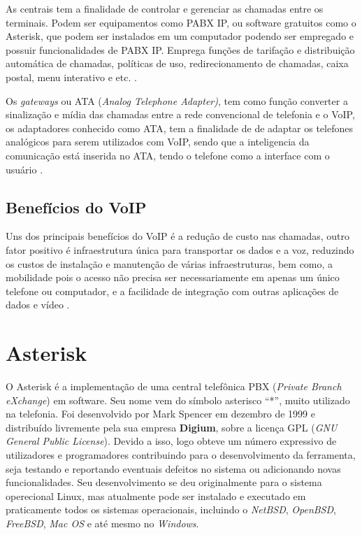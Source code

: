 As centrais tem a finalidade de controlar e gerenciar as chamadas entre os terminais. Podem ser equipamentos como PABX IP, ou software gratuitos como o Asterisk, que podem ser instalados em um computador podendo ser empregado e possuir funcionalidades de PABX IP. Emprega funções de tarifação e distribuição automática de chamadas, políticas de uso, redirecionamento de chamadas, caixa postal, menu interativo e etc. \cite{alexandrekeller2014}.

Os \textit{gateways} ou ATA (\textit{Analog Telephone Adapter)}, tem como função converter a sinalização e mídia das chamadas entre a rede convencional de telefonia e o VoIP, os adaptadores conhecido como ATA, tem a finalidade de de adaptar os telefones analógicos para serem utilizados com VoIP, sendo que a inteligencia da comunicação está inserida no ATA, tendo o telefone como a interface com o usuário \cite{eduardomaronasmonks2006}.


\subsection{Benefícios do VoIP}
Uns dos principais benefícios do VoIP é a redução de custo nas chamadas, outro fator positivo é infraestrutura única para transportar os dados e a voz, reduzindo os custos de instalação e manutenção de várias infraestruturas, bem como, a mobilidade pois o acesso não precisa ser necessariamente em apenas
um único telefone ou computador, e a facilidade de integração com outras aplicações de dados e vídeo \cite{djaneelmajoanine2007}.

\section{Asterisk}
O Asterisk é a implementação de uma central telefônica PBX (\textit{Private Branch eXchange}) em software. Seu nome vem do símbolo asterisco ``*'', muito utilizado na telefonia. Foi desenvolvido por Mark Spencer em dezembro de 1999 e distribuído livremente pela sua empresa \textbf{Digium}, sobre a licença GPL (\textit{GNU General Public License}). Devido a isso, logo obteve um número expressivo de utilizadores e programadores contribuindo para o desenvolvimento da ferramenta, seja testando e reportando eventuais defeitos no sistema ou adicionando novas funcionalidades. Seu desenvolvimento se deu originalmente para o sistema operecional Linux, mas atualmente pode ser instalado e executado em praticamente todos os sistemas operacionais, incluindo o \textit{NetBSD}, \textit{OpenBSD}, \textit{FreeBSD}, \textit{Mac OS} e até mesmo no \textit{Windows}. \cite{alexandrekeller2014}

